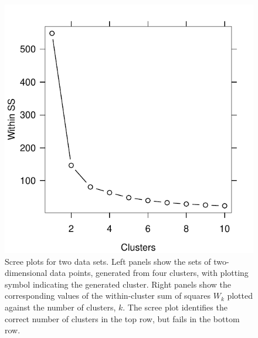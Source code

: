 \documentclass[12pt]{article}
\begin{document}
\begin{figure}
\begin{minipage}{\linewidth}
\begin{minipage}{0.45\linewidth}
  \end{minipage}
  \hspace{0.05in}
  \begin{minipage}{0.45\linewidth}
    \includegraphics[width=\linewidth]{main_code/demo/elbow/incorrect-withinss.pdf}
  \end{minipage}
\end{minipage}
\caption{Scree plots for two data sets. Left panels show the sets of
    two-dimensional data points, generated from four clusters, with plotting
    symbol indicating the generated cluster. Right panels show the
    corresponding values of the within-cluster sum of squares $W_k$
    plotted against the number of clusters, $k$. The scree plot identifies
    the correct number of clusters in the top row, but fails in the bottom
    row.}
\label{fig:elbow}
\end{figure}
\end{document}
